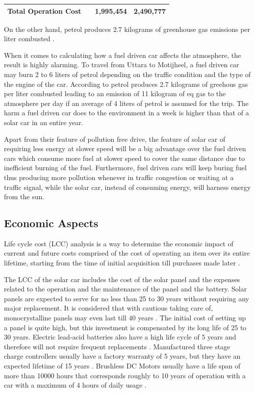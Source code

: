 \documentclass[journal]{IEEEtran/IEEEtran}
\begin{document}
\begin{table}[t]
\begin{tabular}{|l|c|c|c|c|}
			Total Operation Cost & \multicolumn{2}{c|}{} &  1,995,454 & 2,490,777 \\ \hline
		\end{tabular}
	\end{table}
	On the other hand, petrol produces 2.7 kilograms of greenhouse gas emissions per
	liter combusted \cite{iran}.
	
	When it comes to calculating how a fuel driven car affects the atmosphere, the result is highly alarming. To travel from Uttara to Motijheel, a fuel driven car may burn 2 to 6 liters of petrol depending on the traffic condition and the type of the engine of the car. According to \cite{iran} petrol produces 2.7 kilograms of greehous gas per liter combusted leading to an emission of 11 kilogram of  eq gas to the atmosphere per day if an average of 4 liters of petrol is assumed for the trip. The harm a fuel driven car does to the environment in a week is higher than that of a solar car in an entire year.
	
	Apart from their feature of pollution free drive, the feature of solar car of requiring less energy at slower speed will be a big advantage over the fuel driven cars which consume more fuel at slower speed to cover the same distance due to inefficient burning of the fuel. Furthermore, fuel driven cars will keep buring fuel thus producing more pollution whenever in traffic congestion or waiting at a traffic signal, while the solar car, instead of consuming energy, will harness energy from the sun.
	
	\subsection{Economic Aspects}
	
	
	Life cycle cost (LCC) analysis is a way to determine the economic impact
	of current and future costs comprised of the
	cost of operating an item over its entire lifetime, starting from the time of initial acquisition till purchases made later \cite{messenger}.
	
	The LCC of the solar car includes the cost of the solar panel and the expenses related to the operation and the maintenance of the panel and the battery. Solar panels are expected to serve for no less than 25 to 30 years without requiring any major replacement. It is considered that with cautious taking care of, monocrystalline panels may even last till 40 years \cite{celik}. The initial cost of setting up a panel is quite high, but this investment is compensated by its long life of 25 to 30 years. Electric lead-acid batteries also have a high life cycle of 5 years and therefore will not require frequent replacements \cite{celik}. Manufactured three
	stage charge controllers usually have a factory warranty of 5
	years, but they have an expected lifetime of 15 years \cite{ecodirect}.
	Brushless DC Motors usually have a life span of more than 10000 hours that corresponds roughly to 10 years of operation with a car with a maximum of 4 hours of daily usage \cite{minebea}.
	
\end{document}
